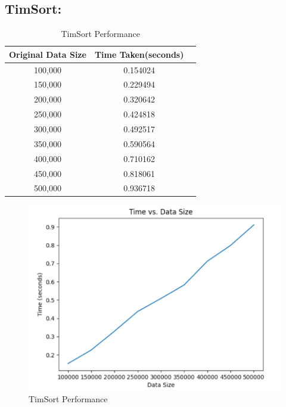 \documentclass[a4paper, 9pt, twocolumn]{article}
\begin{document}
\subsection*{TimSort:}
\vspace{-6mm}
\begin{table}[!hbt]
	\centering
	\label{tab:tim_sort_table}
	\vspace{2mm}
	\begin{tabular}{|c|c|c|}
		\hline
		\textbf{Original Data Size} & \textbf{Time Taken(seconds)} \\
		\hline
		100,000                   & 0.154024                     \\
		150,000                   & 0.229494                     \\
		200,000                   & 0.320642                     \\
		250,000                   & 0.424818                     \\
		300,000                   & 0.492517                     \\
		350,000                   & 0.590564                     \\
		400,000                   & 0.710162                     \\
		450,000                   & 0.818061                     \\
		500,000                   & 0.936718                     \\
		\hline
	\end{tabular}
	\caption{TimSort Performance}
\end{table}

\begin{figure}[!hbt]
	\centering
	\includegraphics[width=0.9\linewidth, height=0.6\linewidth]{tim_sort.png}  %
	\caption{TimSort Performance}
	\label{fig:tim_sort}
\end{figure}
\newpage
\end{document}
